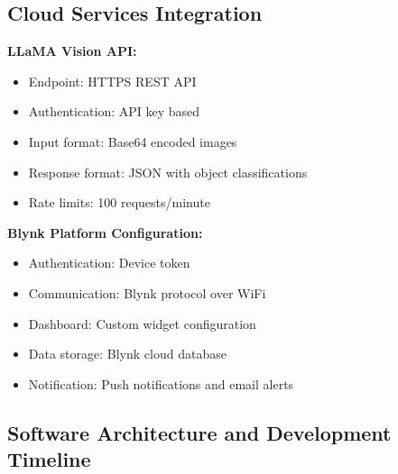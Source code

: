 \subsection{Cloud Services Integration}
\textbf{LLaMA Vision API:}
\begin{itemize}
\item Endpoint: HTTPS REST API
\item Authentication: API key based
\item Input format: Base64 encoded images
\item Response format: JSON with object classifications
\item Rate limits: 100 requests/minute
\end{itemize}

\textbf{Blynk Platform Configuration:}
\begin{itemize}
\item Authentication: Device token
\item Communication: Blynk protocol over WiFi
\item Dashboard: Custom widget configuration
\item Data storage: Blynk cloud database
\item Notification: Push notifications and email alerts
\end{itemize}

\subsection{Software Architecture and Development Timeline}

